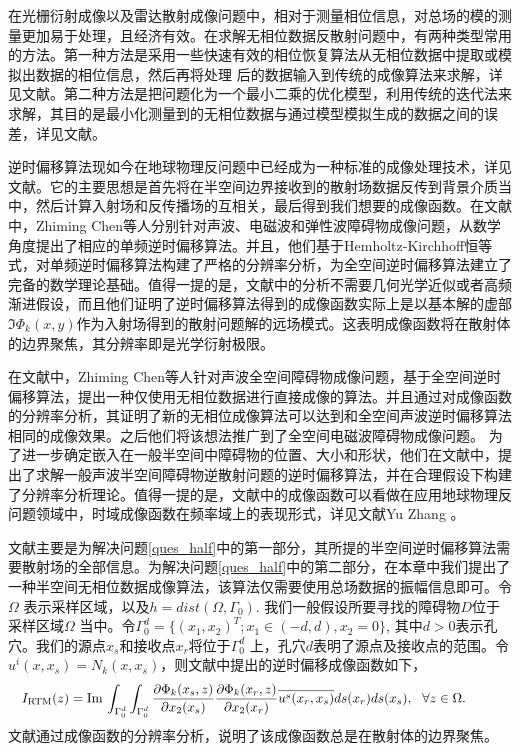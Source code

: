 在光栅衍射成像以及雷达散射成像问题中\cite{d89, dbc}，相对于测量相位信息，对总场的模的测量更加易于处理，且经济有效。在求解无相位数据反散射问题中，有两种类型常用的方法。第一种方法是采用一些快速有效的相位恢复算法从无相位数据中提取或模拟出数据的相位信息，然后再将处理
后的数据输入到传统的成像算法来求解，详见文献\cite{fda, bv, nmp}。第二种方法是把问题化为一个最小二乘的优化模型，利用传统的迭代法来求解，其目的是最小化测量到的无相位数据与通过模型模拟生成的数据之间的误差，详见文献\cite{kr, LK2010, LK2011,bll,cmp}。

逆时偏移算法现如今在地球物理反问题中已经成为一种标准的成像处理技术，详见文献\cite{bcs}。它的主要思想是首先将在半空间边界接收到的散射场数据反传到背景介质当中，然后计算入射场和反传播场的互相关，最后得到我们想要的成像函数。在文献
\cite{cch_a,cch_e,ch_e}中，Zhiming Chen等人分别针对声波、电磁波和弹性波障碍物成像问题，从数学角度提出了相应的单频逆时偏移算法。并且，他们基于Hemholtz-Kirchhoff恒等式，对单频逆时偏移算法构建了严格的分辨率分析，为全空间逆时偏移算法建立了完备的数学理论基础。值得一提的是，文献\cite{cch_a,cch_e,ch_e}中的分析不需要几何光学近似或者高频渐进假设，而且他们证明了逆时偏移算法得到的成像函数实际上是以基本解的虚部$\Im\Phi_k(x,y)$作为入射场得到的散射问题解的远场模式。这表明成像函数将在散射体的边界聚焦，其分辨率即是光学衍射极限。

在文献\cite{ch_pha}中，Zhiming Chen等人针对声波全空间障碍物成像问题，基于全空间逆时偏移算法，提出一种仅使用无相位数据进行直接成像的算法。并且通过对成像函数的分辨率分析，其证明了新的无相位成像算法可以达到和全空间声波逆时偏移算法\cite{cch_a}相同的成像效果。之后他们将该想法推广到了全空间电磁波障碍物成像问题\cite{ch_e}。
为了进一步确定嵌入在一般半空间中障碍物的位置、大小和形状，他们在文献\cite{ch_ha}中，提出了求解一般声波半空间障碍物逆散射问题的逆时偏移算法，并在合理假设下构建了分辨率分析理论。值得一提的是，文献\cite{ch_ha}中的成像函数可以看做在应用地球物理反问题领域中，时域成像函数在频率域上的表现形式，详见文献Yu Zhang\cite{zs07, zs09} 。

文献\cite{ch_ha}主要是为解决问题\ref{ques_half}中的第一部分，其所提的半空间逆时偏移算法需要散射场的全部信息。为解决问题\ref{ques_half}中的第二部分，在本章中我们提出了一种半空间无相位数据成像算法，该算法仅需要使用总场数据的振幅信息即可。令 $\Omega$ 表示采样区域，以及$h=dist(\Omega,\Gamma_0)$. 我们一般假设所要寻找的障碍物$D$位于采样区域$\Omega$ 当中。令$\Gamma_0^d=\{(x_1,x_2)^T;x_1\in(-d,d),x_2=0\}$, 其中$d>0$表示孔穴。我们的源点$x_s$和接收点$x_r$将位于$\Gamma_0^d$ 上，孔穴$d$表明了源点及接收点的范围。令$u^i(x,x_s)=N_k(x,x_s)$，则文献中提出的逆时偏移成像函数如下，
\begin{equation}\label{IFullspace}
 \quad I_{\rm RTM}(z)=\Im\int_{\Gamma_{0}^d}\int_{\Gamma_0^d}\frac{\partial\Phi_k(x_s,z)}{\partial x_2(x_s)}\frac{\partial\Phi_k(x_r,z)}{\partial x_2(x_r)}
  \overline{u^s(x_r,x_s)}ds(x_r)ds(x_s),\  \  \forall z\in\Omega.\hspace{1.2cm}
\end{equation}
文献\cite{ch_ha}通过成像函数的分辨率分析，说明了该成像函数总是在散射体的边界聚焦。

